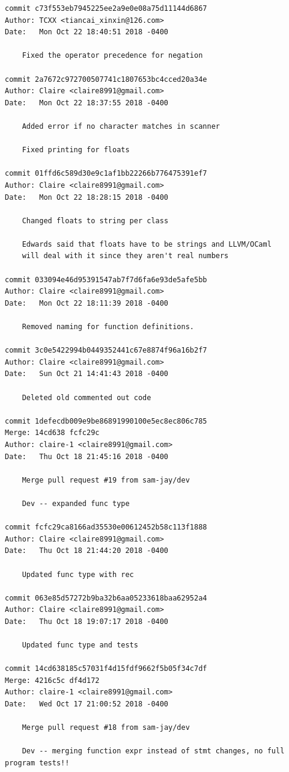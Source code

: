 \documentclass[12pt]{article}
\begin{document}
\begin{lstlisting}
commit c73f553eb7945225ee2a9e0e08a75d11144d6867
Author: TCXX <tiancai_xinxin@126.com>
Date:   Mon Oct 22 18:40:51 2018 -0400

    Fixed the operator precedence for negation

commit 2a7672c972700507741c1807653bc4cced20a34e
Author: Claire <claire8991@gmail.com>
Date:   Mon Oct 22 18:37:55 2018 -0400

    Added error if no character matches in scanner
    
    Fixed printing for floats

commit 01ffd6c589d30e9c1af1bb22266b776475391ef7
Author: Claire <claire8991@gmail.com>
Date:   Mon Oct 22 18:28:15 2018 -0400

    Changed floats to string per class
    
    Edwards said that floats have to be strings and LLVM/OCaml
    will deal with it since they aren't real numbers

commit 033094e46d95391547ab7f7d6fa6e93de5afe5bb
Author: Claire <claire8991@gmail.com>
Date:   Mon Oct 22 18:11:39 2018 -0400

    Removed naming for function definitions.

commit 3c0e5422994b0449352441c67e8874f96a16b2f7
Author: Claire <claire8991@gmail.com>
Date:   Sun Oct 21 14:41:43 2018 -0400

    Deleted old commented out code

commit 1defecdb009e9be86891990100e5ec8ec806c785
Merge: 14cd638 fcfc29c
Author: claire-1 <claire8991@gmail.com>
Date:   Thu Oct 18 21:45:16 2018 -0400

    Merge pull request #19 from sam-jay/dev
    
    Dev -- expanded func type

commit fcfc29ca8166ad35530e00612452b58c113f1888
Author: Claire <claire8991@gmail.com>
Date:   Thu Oct 18 21:44:20 2018 -0400

    Updated func type with rec

commit 063e85d57272b9ba32b6aa05233618baa62952a4
Author: Claire <claire8991@gmail.com>
Date:   Thu Oct 18 19:07:17 2018 -0400

    Updated func type and tests

commit 14cd638185c57031f4d15fdf9662f5b05f34c7df
Merge: 4216c5c df4d172
Author: claire-1 <claire8991@gmail.com>
Date:   Wed Oct 17 21:00:52 2018 -0400

    Merge pull request #18 from sam-jay/dev
    
    Dev -- merging function expr instead of stmt changes, no full program tests!!


\end{lstlisting}
\end{document}
